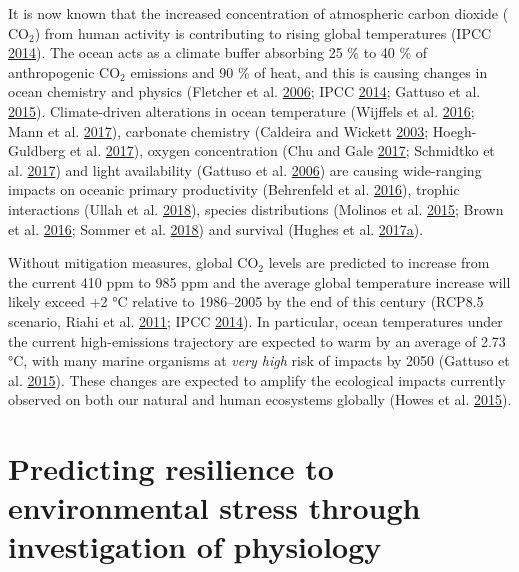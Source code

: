 \documentclass[a4paper,10pt, oneside]{memoir}
\begin{document}
It is now known that the increased concentration of atmospheric carbon dioxide (\(\mathrm{CO_2}\)) from human activity is contributing to rising global temperatures (IPCC \protect\hyperlink{ref-IPCC2014}{2014}).
The ocean acts as a climate buffer absorbing 25 \% to 40 \% of anthropogenic \(\mathrm{CO_2}\) emissions and 90 \% of heat, and this is causing changes in ocean chemistry and physics (Fletcher et al. \protect\hyperlink{ref-Fletcher2006}{2006}; IPCC \protect\hyperlink{ref-IPCC2014}{2014}; Gattuso et al. \protect\hyperlink{ref-Gattuso2015}{2015}).
Climate-driven alterations in ocean temperature (Wijffels et al. \protect\hyperlink{ref-Wijffels2016}{2016}; Mann et al. \protect\hyperlink{ref-Mann2017}{2017}), carbonate chemistry (Caldeira and Wickett \protect\hyperlink{ref-Caldeira2003}{2003}; Hoegh-Guldberg et al. \protect\hyperlink{ref-Hoegh-Guldberg2017}{2017}), oxygen concentration (Chu and Gale \protect\hyperlink{ref-Chu2017}{2017}; Schmidtko et al. \protect\hyperlink{ref-Schmidtko2017}{2017}) and light availability (Gattuso et al. \protect\hyperlink{ref-Gattuso2006}{2006}) are causing wide-ranging impacts on oceanic primary productivity (Behrenfeld et al. \protect\hyperlink{ref-Behrenfeld2016}{2016}), trophic interactions (Ullah et al. \protect\hyperlink{ref-Ullah2018}{2018}), species distributions (Molinos et al. \protect\hyperlink{ref-Molinos2015}{2015}; Brown et al. \protect\hyperlink{ref-Brown2016}{2016}; Sommer et al. \protect\hyperlink{ref-Sommer2018}{2018}) and survival (Hughes et al. \protect\hyperlink{ref-Hughes2017}{2017}\protect\hyperlink{ref-Hughes2017}{a}).

Without mitigation measures, global \(\mathrm{CO_2}\) levels are predicted to increase from the current 410 ppm to 985 ppm and the average global temperature increase will likely exceed +2 °C relative to 1986--2005 by the end of this century (RCP8.5 scenario, Riahi et al. \protect\hyperlink{ref-Riahi2011}{2011}; IPCC \protect\hyperlink{ref-IPCC2014}{2014}).
In particular, ocean temperatures under the current high-emissions trajectory are expected to warm by an average of 2.73 °C, with many marine organisms at \emph{very high} risk of impacts by 2050 (Gattuso et al. \protect\hyperlink{ref-Gattuso2015}{2015}).
These changes are expected to amplify the ecological impacts currently observed on both our natural and human ecosystems globally (Howes et al. \protect\hyperlink{ref-Howes2015}{2015}).

\hypertarget{predicting-resilience-to-environmental-stress-through-investigation-of-physiology}{%
\section{Predicting resilience to environmental stress through investigation of physiology}\label{predicting-resilience-to-environmental-stress-through-investigation-of-physiology}}
\end{document}
